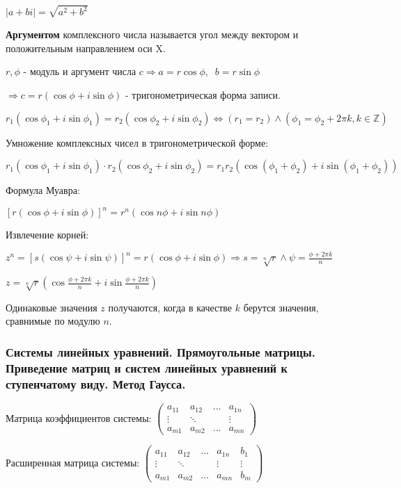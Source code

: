\documentclass{article}
\begin{document}
$|a + b i| = \sqrt{a^2 + b^2}$

\textbf{Аргументом} комплексного числа называется угол между вектором и положительным
направлением оси X.

$r, \phi$ - модуль и аргумент числа $c \Rightarrow a = r \cos \phi, \;\; b = r \sin \phi$

$\Rightarrow c = r (\cos \phi + i \sin\phi)$ - тригонометрическая форма записи.

$r_1(\cos \phi_1 + i \sin\phi_1) = r_2(\cos \phi_2 + i \sin \phi_2) \iff
(r_1 = r_2) \wedge (\phi_1 = \phi_2 + 2 \pi k, k \in \mathbb{Z})$

Умножение комплексных чисел в тригонометрической форме:

$r_1(\cos \phi_1 + i \sin\phi_1) \cdot r_2 (\cos \phi_2 + i \sin\phi_2) =
r_1 r_2 (\cos(\phi_1 + \phi_2) + i \sin (\phi_1 + \phi_2))$

Формула Муавра:

$[r(\cos\phi + i \sin\phi)]^n = r^n (\cos n\phi + i \sin n\phi)$

Извлечение корней:

$z^n = [s(\cos\psi + i \sin\psi)]^n = r (\cos \phi + i\sin\phi) \Rightarrow
s = \sqrt[n]{r} \wedge \psi = \frac{\phi + 2 \pi k}{n}$

$z = \sqrt[n]{r}(\cos\frac{\phi + 2 \pi k}{n} + i \sin\frac{\phi + 2 \pi k}{n})$

Одинаковые значения $z$ получаются, когда в качестве $k$ берутся значения,
сравнимые по модулю $n$.



\subsubsection{Системы линейных уравнений. Прямоугольные матрицы. Приведение матриц и систем
линейных уравнений к ступенчатому виду. Метод Гаусса.}


Матрица коэффициентов системы:
$\begin{pmatrix}
    a_{11} & a_{12} & ... & a_{1n} \\
    \vdots & \ddots &  & \vdots\\
    a_{m1} & a_{m2} & ... & a_{mn}
\end{pmatrix}$

Расширенная матрица системы:
$\begin{pmatrix}
    a_{11} & a_{12} & ... & a_{1n} & b_1 \\
    \vdots & \ddots &  & \vdots & \vdots \\
    a_{m1} & a_{m2} & ... & a_{mn} & b_m
\end{pmatrix}$
\end{document}
